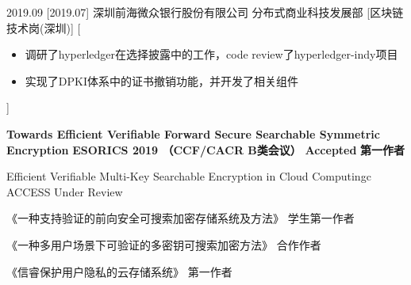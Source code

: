 \documentclass[zh]{resume}
\begin{document}
\begin{experiences}
  \experience
    {2019.09}%
    [2019.07]%
    {深圳前海微众银行股份有限公司}%
    {分布式商业科技发展部}%
    [区块链技术岗(深圳)]%
    [\begin{itemize}
      \item{\icon{\faFlag}} 调研了hyperledger在选择披露中的工作，code review了hyperledger-indy项目
      \item{\icon{\faFlag}} 实现了DPKI体系中的证书撤销功能，并开发了相关组件 
    \end{itemize}]%

\end{experiences}


\begin{myresearchs}
  \myresearch
    {\textbf{Towards Efficient Verifiable Forward Secure Searchable Symmetric Encryption}}
    {\textbf{ESORICS 2019 （CCF/CACR B类会议）}}
    {\textbf{Accepted}}
    {\textbf{第一作者}}%

  \myresearch
    {Efficient Verifiable Multi-Key Searchable Encryption in Cloud Computingc}
    {ACCESS}
    {Under Review}
    { }

  \myzhuanli
    {《一种支持验证的前向安全可搜索加密存储系统及方法》}
    {学生第一作者}

  \myzhuanli
    {《一种多用户场景下可验证的多密钥可搜索加密方法》}
    {合作作者}

  \myruanzhu
    {《信睿保护用户隐私的云存储系统》}
    {第一作者}

\end{myresearchs}
\end{document}
